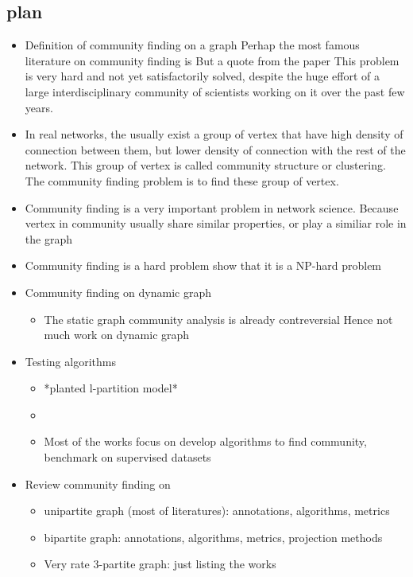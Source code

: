 \subsection{plan}
\begin{itemize}
	\item Definition of community finding on a graph
	      Perhap the most famous literature on community finding is \cite{fortunato2010}
	      But a quote from the paper
	      This problem is very hard and not yet satisfactorily solved, despite the huge effort of a large interdisciplinary community of scientists working on it over the past few years.
	\item In real networks, the usually exist a group of vertex that have high density of connection between them,
	      but lower density of connection with the rest of the network.
	      This group of vertex is called community structure or clustering.
	      The community finding problem is to find these group of vertex.
	\item Community finding is a very important problem in network science.
	      Because vertex in community usually share similar properties, or play a similiar role in the graph

	\item Community finding is a hard problem
	      \cite{fortunato2010} show that it is a NP-hard problem
	\item Community finding on dynamic graph
	      \begin{itemize}
		      \item The static graph community analysis is already contreversial
		            Hence not much work on dynamic graph
	      \end{itemize}
	\item Testing algorithms
	      \begin{itemize}
		      \item *planted l-partition model* \cite{fortunato2010}
		      \item
	      \end{itemize}
	      \begin{itemize}
		      \item Most of the works focus on develop algorithms to find community, benchmark on supervised datasets
	      \end{itemize}
	\item Review community finding on
	      \begin{itemize}
		      \item unipartite graph (most of literatures): annotations, algorithms, metrics
		      \item bipartite graph: annotations, algorithms, metrics, projection methods
		      \item Very rate 3-partite graph: just listing the works
	      \end{itemize}

\end{itemize}

